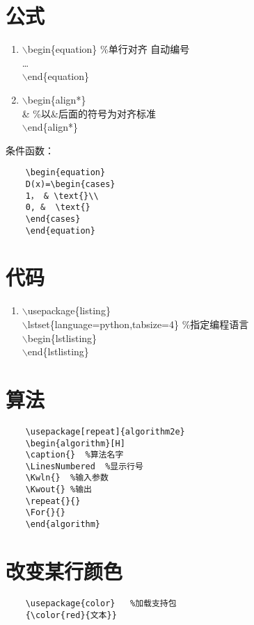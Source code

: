 \documentclass{article}
\begin{document}
\section{公式}

	\begin{enumerate}[格式1：]
		\item 	$\backslash$begin\{equation\}	\%单行对齐 自动编号 \\
				\ldots  \\
				$\backslash$end\{equation\}
				
		\item $\backslash$begin\{align*\}  \\
		   \&  \quad \%以\&后面的符号为对齐标准  \\
		$\backslash$end\{align*\}
		
	\end{enumerate}
 条件函数：
	\begin{lstlisting}
	\begin{equation}
	D(x)=\begin{cases}
	1， & \text{}\\
	0, &  \text{}
	\end{cases}
	\end{equation}
	\end{lstlisting}
\section{代码}
	\begin{enumerate}
	\item	$\backslash$usepackage\{listing\} \\
		   $\backslash$lstset\{language=python,tabsize=4\}  \%指定编程语言\\
		   	$\backslash$begin\{lstlisting\}\\
		   		$\backslash$end\{lstlisting\}
	\end{enumerate}
\section{算法}
\begin{lstlisting}
	\usepackage[repeat]{algorithm2e}
	\begin{algorithm}[H]
	\caption{}  %算法名字
	\LinesNumbered  %显示行号
	\Kwln{}  %输入参数
	\Kwout{} %输出
	\repeat{}{}
	\For{}{}
	\end{algorithm}
\end{lstlisting}
\section{改变某行颜色}
\begin{lstlisting}
	\usepackage{color}   %加载支持包
	{\color{red}{文本}}
\end{lstlisting}
\end{document}
